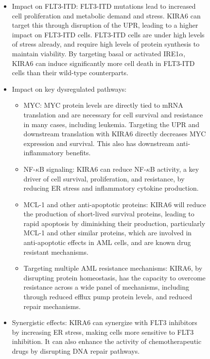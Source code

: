 \begin{figure}[htbp!]
\begin{tcolorbox}[
    colback=black!5!white,
    colframe=black!60!white,
    title=\textbf{KIRA6 for AML (continued)},
    fonttitle=\bfseries,
    arc=3mm,
    boxrule=1pt,
    bottomrule=2pt,
]
\begin{itemize}
\begin{itemize}
    \end{itemize}
    \item Impact on FLT3-ITD: FLT3-ITD mutations lead to increased cell proliferation and metabolic demand and stress. KIRA6 can target this through disruption of the UPR, leading to a higher impact on FLT3-ITD cells. FLT3-ITD cells are under high levels of stress already, and require high levels of protein synthesis to maintain viability. By targeting basal or activated IRE1$\alpha$, KIRA6 can induce significantly more cell death in FLT3-ITD cells than their wild-type counterparts.
    \item Impact on key dysregulated pathways:
    \begin{itemize}
        \item  MYC: MYC protein levels are directly tied to mRNA translation and are necessary for cell survival and resistance in many cases, including leukemia. Targeting the UPR and downstream translation with KIRA6 directly decreases MYC expression and survival. This also has downstream anti-inflammatory benefits.
        \item  NF-$\kappa$B signaling: KIRA6 can reduce NF-$\kappa$B activity, a key driver of cell survival, proliferation, and resistance, by reducing ER stress and inflammatory cytokine production.
        \item  MCL-1 and other anti-apoptotic proteins: KIRA6 will reduce the production of short-lived survival proteins, leading to rapid apoptosis by diminishing their production, particularly MCL-1 and other similar proteins, which are involved in anti-apoptotic effects in AML cells, and are known drug resistant mechanisms.
        \item  Targeting multiple AML resistance mechanisms: KIRA6, by disrupting protein homeostasis, has the capacity to overcome resistance across a wide panel of mechanisms, including through reduced efflux pump protein levels, and reduced repair mechanisms.
    \end{itemize}
    \item Synergistic effects: KIRA6 can synergize with FLT3 inhibitors by increasing ER stress, making cells more sensitive to FLT3 inhibition. It can also enhance the activity of chemotherapeutic drugs by disrupting DNA repair pathways.
\end{itemize}


\end{tcolorbox}
\end{figure}

